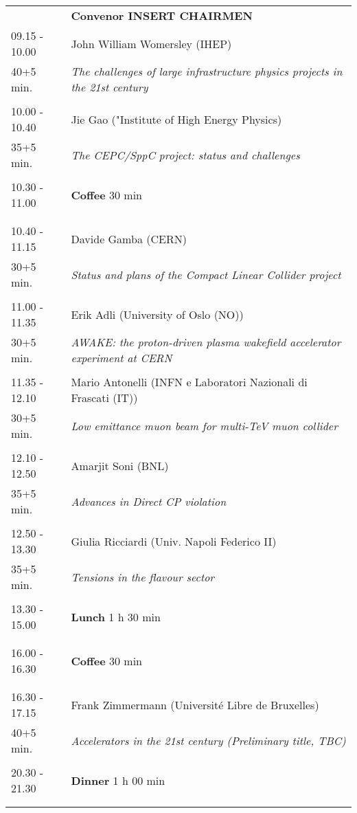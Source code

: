 \begin{longtable}{p{3cm}p{13cm}}
&\hfill {\bf Convenor INSERT CHAIRMEN }\\ 
09.15 - 10.00 & John William Womersley (IHEP)\\ 
40+5 min. & {\it The challenges of large infrastructure physics projects in the 21st century}\\ 
 & \\ 
10.00 - 10.40 & Jie Gao ("Institute of High Energy Physics)\\ 
35+5 min. & {\it The CEPC/SppC project: status and challenges}\\ 
 & \\ 
10.30 - 11.00 & {\bf Coffee} \hfill 30 min \\ 
 & \\ 
 & \\ 
10.40 - 11.15 & Davide Gamba (CERN)\\ 
30+5 min. & {\it Status and plans of the Compact Linear Collider project}\\ 
 & \\ 
11.00 - 11.35 & Erik Adli (University of Oslo (NO))\\ 
30+5 min. & {\it AWAKE: the proton-driven plasma wakefield accelerator experiment at CERN}\\ 
 & \\ 
11.35 - 12.10 & Mario Antonelli (INFN e Laboratori Nazionali di  Frascati (IT))\\ 
30+5 min. & {\it Low emittance muon beam for multi-TeV muon collider}\\ 
 & \\ 
12.10 - 12.50 & Amarjit Soni (BNL)\\ 
35+5 min. & {\it Advances in Direct CP violation}\\ 
 & \\ 
12.50 - 13.30 & Giulia Ricciardi (Univ. Napoli Federico II)\\ 
35+5 min. & {\it Tensions in the flavour sector}\\ 
 & \\ 
13.30 - 15.00 & {\bf Lunch} \hfill 1 h 30 min \\ 
 & \\ 
 & \\ 
16.00 - 16.30 & {\bf Coffee} \hfill 30 min \\ 
 & \\ 
 & \\ 
16.30 - 17.15 & Frank Zimmermann (Université Libre de Bruxelles)\\ 
40+5 min. & {\it Accelerators in the 21st century (Preliminary title, TBC)}\\ 
 & \\ 
20.30 - 21.30 & {\bf Dinner} \hfill 1 h 00 min \\ 
 & \\ 
 & \\ 
\end{longtable}

